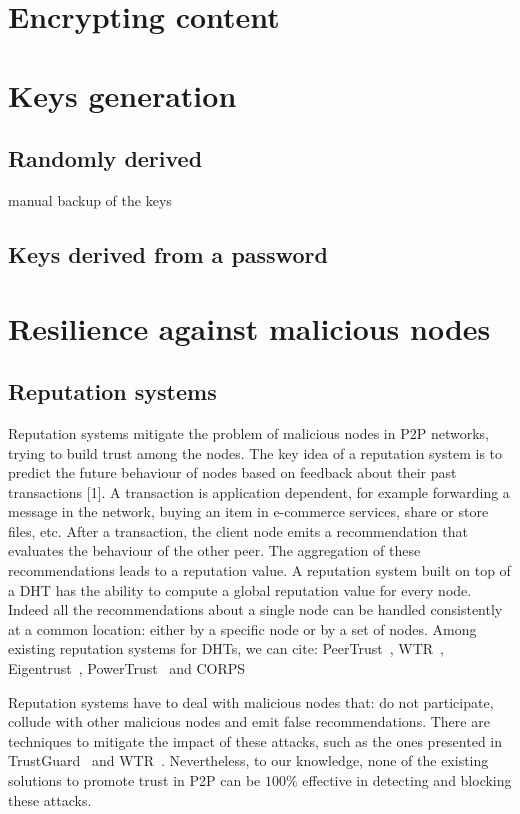 \section{Encrypting content}

\section{Keys generation}
\subsection{Randomly derived}
  manual backup of the keys
\subsection{Keys derived from a password}

\section{Resilience against malicious nodes}

 \subsection{Reputation systems}
Reputation systems mitigate the problem of malicious nodes in
P2P networks, trying to build trust among the nodes. The key
idea of a reputation system is to predict the future behaviour
of nodes based on feedback about their past transactions [1]. A
transaction is application dependent, for example forwarding a
message in the network, buying an item in e-commerce services,
share or store files, etc. After a transaction, the client node emits
a recommendation that evaluates the behaviour of the other peer.
The aggregation of these recommendations leads to a reputation
value.
A reputation system built on top of a DHT has the ability
to compute a global reputation value for every node. Indeed
all the recommendations about a single node can be handled
consistently at a common location: either by a specific node
or by a set of nodes. Among existing reputation systems for
DHTs, we can cite: PeerTrust~\cite{peertrust}, WTR~\cite{wtr},
Eigentrust~\cite{eigentrust},
PowerTrust~\cite{powertrust} and CORPS~\cite{corps}

Reputation systems have to deal with malicious nodes that:
do not participate, collude with other malicious nodes and
emit false recommendations. There are techniques to mitigate
the impact of these attacks, such as the ones presented in
TrustGuard~\cite{trustguard} and WTR~\cite{wtr}. Nevertheless, to our knowledge,
none of the existing solutions to promote trust in P2P can be
$100\%$ effective in detecting and blocking these attacks.

